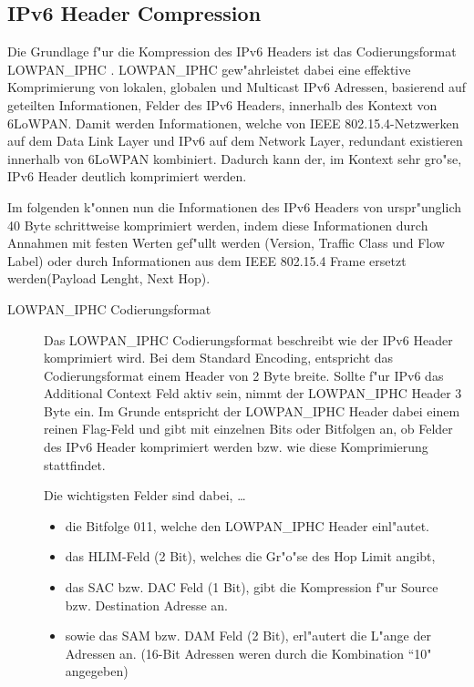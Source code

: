 \documentclass[final]{lktseminar}
\begin{document}
\subsection{IPv6 Header Compression}
\label{sec: IPv6 Header Compression}

Die Grundlage f"ur die Kompression des IPv6 Headers ist das Codierungsformat LOWPAN\_IPHC \cite{rfc6282}.
LOWPAN\_IPHC gew"ahrleistet dabei eine effektive Komprimierung von lokalen, globalen und Multicast IPv6 Adressen,
basierend auf geteilten Informationen, Felder des IPv6 Headers, innerhalb des Kontext von 6LoWPAN.
Damit werden Informationen, welche von IEEE 802.15.4-Netzwerken auf dem Data Link Layer und IPv6 auf dem Network Layer,
redundant existieren innerhalb von 6LoWPAN kombiniert. Dadurch kann der, im Kontext sehr gro"se, IPv6 Header
deutlich komprimiert werden.

Im folgenden k"onnen nun die Informationen des IPv6 Headers von urspr"unglich 40 Byte schrittweise komprimiert werden,
indem diese Informationen durch Annahmen mit festen Werten gef"ullt werden (Version, Traffic Class und Flow Label)
oder durch Informationen aus dem IEEE 802.15.4 Frame ersetzt werden(Payload Lenght, Next Hop).

\begin{description}
    \item[LOWPAN\_IPHC Codierungsformat] Das LOWPAN\_IPHC Codierungsformat beschreibt wie der IPv6 Header komprimiert wird.
    Bei dem Standard Encoding, entspricht das Codierungsformat einem Header von 2 Byte breite.
    Sollte f"ur IPv6 das Additional Context Feld aktiv sein, nimmt der LOWPAN\_IPHC Header 3 Byte ein.
    Im Grunde entspricht der LOWPAN\_IPHC Header dabei einem reinen Flag-Feld und gibt mit einzelnen Bits oder Bitfolgen an,
    ob Felder des IPv6 Header komprimiert werden bzw. wie diese Komprimierung stattfindet.

    Die wichtigsten Felder sind dabei, \dots
    \begin{itemize}
        \item die Bitfolge 011, welche den LOWPAN\_IPHC Header einl"autet.
        \item das HLIM-Feld (2 Bit), welches die Gr"o"se des Hop Limit angibt,
        \item das SAC bzw. DAC Feld (1 Bit), gibt die Kompression f"ur Source bzw. Destination Adresse an.
        \item sowie das SAM bzw. DAM Feld (2 Bit), erl"autert die L"ange der Adressen an.
        (16-Bit Adressen weren durch die Kombination ``10" angegeben)
    \end{itemize}
\end{description}
\end{document}
